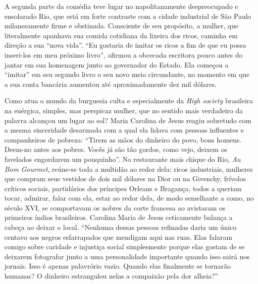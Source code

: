 \documentclass[
  letterpaper,
  DIV=11,
  numbers=noendperiod]{scrreprt}
\begin{document}
A segunda parte da comédia teve lugar no napolitanamente despreocupado e
ensolarado Rio, que está em forte contraste com a cidade industrial de
São Paulo milanesamente firme e obstinada. Consciente de seu propósito,
a mulher, que literalmente apanhava sua comida cotidiana da lixeira dos
ricos, caminha em direção a sua ``nova vida''. ``Eu gostaria de imitar
os ricos a fim de que eu possa inseri-los em meu próximo livro'',
afirmou a obcecada escritora pouco antes do jantar em sua homenagem
junto ao governador do Estado. Ela começou a ``imitar'' em seu segundo
livro o seu novo meio circundante, no momento em que a sua conta
bancária aumentou até aproximadamente dez mil dólares.

Como atua o mundo da burguesia culta e especialmente da \emph{High
society} brasileira na enérgica, simples, mas perspicaz mulher, que no
sentido mais verdadeiro da palavra alcançou um lugar ao sol? Maria
Carolina de Jesus reagiu sobretudo com a mesma sinceridade desarmada com
a qual ela lidava com pessoas influentes e companheiros de pobreza:
``Tirem as mãos do dinheiro do povo, bons homens. Deem-no antes aos
pobres. Vocês já são tão gordos, como vejo, deixem os favelados
engordarem um pouquinho''. No restaurante mais chique do Rio, \emph{Au
Bom Gourmet}, reúne-se toda a multidão ao redor dela: ricos industriais,
mulheres que compram seus vestidos de dois mil dólares na Dior ou na
Givenchy, frívolos críticos sociais, partidários dos príncipes Orleans e
Bragança, todos a queriam tocar, admirar, falar com ela, estar ao redor
dela, de modo semelhante a como, no século XVI, se comportavam os nobres
da corte francesa ao avistaram os primeiros índios brasileiros. Carolina
Maria de Jesus ceticamente balança a cabeça ao deixar o local. ``Nenhuma
dessas pessoas refinadas daria um único centavo aos negros esfarrapados
que mendigam aqui nas ruas. Elas falaram comigo sobre caridade e
injustiça social simplesmente porque elas gostam de se deixarem
fotografar junto a uma personalidade importante quando isso sairá nos
jornais. Isso é apenas palavrório vazio. Quando elas finalmente se
tornarão humanas? O dinheiro estrangulou nelas a compaixão pela dor
alheia?''
\end{document}
